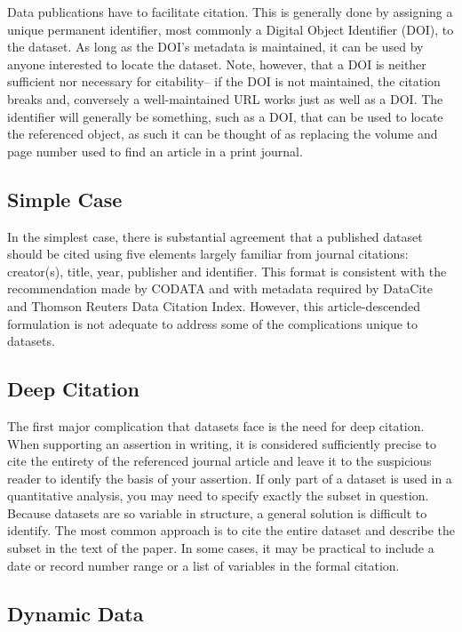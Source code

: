 \documentclass[10pt,a4paper,twocolumn]{article}
\begin{document}
Data publications have to facilitate citation. 
This is generally done by assigning a unique permanent identifier, most commonly a Digital Object Identifier (DOI), to the dataset. 
As long as the DOI's metadata is maintained, it can be used by anyone interested to locate the dataset. 
Note, however, that a DOI is neither sufficient nor necessary for citability-- if the DOI is not maintained, the citation breaks and, conversely a well-maintained URL works just as well as a DOI. 
The identifier will generally be something, such as a DOI, that can be used to locate the referenced object, as such it can be thought of as replacing the volume and page number used to find an article in a print journal.

\subsection*{Simple Case}\label{simple-case}

In the simplest case, there is substantial agreement that a published dataset should be cited using five elements largely familiar from journal citations: creator(s), title, year, publisher and identifier. 
This format is consistent with the recommendation made by CODATA\cite{socha_out_2013} and with metadata required by DataCite \cite{datacite_datacite_2013} and Thomson Reuters Data Citation Index. However, this article-descended formulation is not adequate to address some of the complications unique to datasets. 

\subsection*{Deep Citation}\label{deep-citation}

The first major complication that datasets face is the need for deep citation. 
When supporting an assertion in writing, it is considered sufficiently precise to cite the entirety of the referenced journal article and leave it to the suspicious reader to identify the basis of your assertion. 
If only part of a dataset is used in a quantitative analysis, you may need to specify exactly the subset in question. 
Because datasets are so variable in structure, a general solution is difficult to identify. 
The most common approach is to cite the entire dataset and describe the subset in the text of the paper. 
In some cases, it may be practical to include a date or record number range or a list of variables in the formal citation. 
\subsection*{Dynamic Data}\label{dynamic-data}
\end{document}
